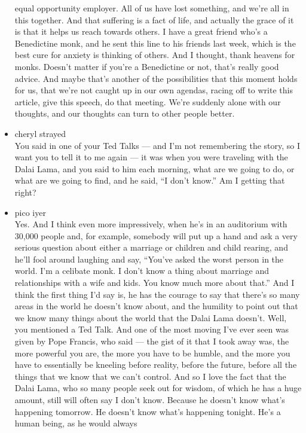 \begin{itemize}
  equal opportunity employer. All of us have lost something, and we're
  all in this together. And that suffering is a fact of life, and
  actually the grace of it is that it helps us reach towards others. I
  have a great friend who's a Benedictine monk, and he sent this line to
  his friends last week, which is the best cure for anxiety is thinking
  of others. And I thought, thank heavens for monks. Doesn't matter if
  you're a Benedictine or not, that's really good advice. And maybe
  that's another of the possibilities that this moment holds for us,
  that we're not caught up in our own agendas, racing off to write this
  article, give this speech, do that meeting. We're suddenly alone with
  our thoughts, and our thoughts can turn to other people better.
\item
  cheryl strayed\\
  You said in one of your Ted Talks --- and I'm not remembering the
  story, so I want you to tell it to me again --- it was when you were
  traveling with the Dalai Lama, and you said to him each morning, what
  are we going to do, or what are we going to find, and he said, ``I
  don't know.'' Am I getting that right?
\item
  pico iyer\\
  Yes. And I think even more impressively, when he's in an auditorium
  with 30,000 people and, for example, somebody will put up a hand and
  ask a very serious question about either a marriage or children and
  child rearing, and he'll fool around laughing and say, ``You've asked
  the worst person in the world. I'm a celibate monk. I don't know a
  thing about marriage and relationships with a wife and kids. You know
  much more about that.'' And I think the first thing I'd say is, he has
  the courage to say that there's so many areas in the world he doesn't
  know about, and the humility to point out that we know many things
  about the world that the Dalai Lama doesn't. Well, you mentioned a Ted
  Talk. And one of the most moving I've ever seen was given by Pope
  Francis, who said --- the gist of it that I took away was, the more
  powerful you are, the more you have to be humble, and the more you
  have to essentially be kneeling before reality, before the future,
  before all the things that we know that we can't control. And so I
  love the fact that the Dalai Lama, who so many people seek out for
  wisdom, of which he has a huge amount, still will often say I don't
  know. Because he doesn't know what's happening tomorrow. He doesn't
  know what's happening tonight. He's a human being, as he would always

\end{itemize}
